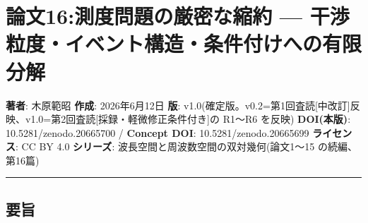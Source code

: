 \documentclass[
]{ltjsarticle}
\author{}
\date{}
\begin{document}
\section{論文16:測度問題の厳密な縮約 ---
干渉粒度・イベント構造・条件付けへの有限分解}\label{ux8ad6ux658716ux6e2cux5ea6ux554fux984cux306eux53b3ux5bc6ux306aux7e2eux7d04-ux5e72ux6e09ux7c92ux5ea6ux30a4ux30d9ux30f3ux30c8ux69cbux9020ux6761ux4ef6ux4ed8ux3051ux3078ux306eux6709ux9650ux5206ux89e3}

\textbf{著者}: 木原範昭 \textbf{作成}: 2026年6月12日 \textbf{版}:
v1.0(確定版。v0.2=第1回査読{[}中改訂{]}反映、v1.0=第2回査読{[}採録・軽微修正条件付き{]}の
R1〜R6 を反映) \textbf{DOI(本版)}: 10.5281/zenodo.20665700 /
\textbf{Concept DOI}: 10.5281/zenodo.20665699 \textbf{ライセンス}: CC BY
4.0 \textbf{シリーズ}: 波長空間と周波数空間の双対幾何(論文1〜15
の続編、第16篇)

\begin{center}\rule{0.5\linewidth}{0.5pt}\end{center}

\subsection{要旨}\label{ux8981ux65e8}
\end{document}
